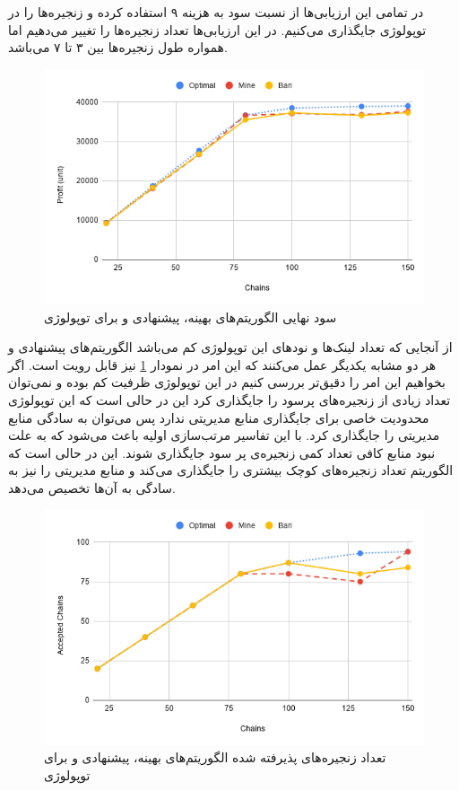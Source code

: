 در تمامی این ارزیابی‌ها از نسبت سود به هزینه ۹ استفاده کرده و
زنجیره‌ها را در توپولوژی  جایگذاری می‌کنیم.
در این ارزیابی‌ها تعداد زنجیره‌ها را تغییر می‌دهیم اما همواره طول زنجیره‌ها بین ۳ تا ۷ می‌باشد.


\begin{figure}[h!]
\center\includegraphics[scale=.5]{images/chart-6}
\caption{سود نهایی الگوریتم‌های بهینه، پیشنهادی و \cite{Bari2015} برای توپولوژی }
\label{fig.11}
\end{figure}

از آنجایی که تعداد لینک‌ها و نودهای این توپولوژی کم می‌باشد الگوریتم‌های پیشنهادی و \cite{Bari2015} هر دو مشابه یکدیگر عمل می‌کنند
که این امر در نمودار \ref{fig.11}
نیز قابل رویت است.
اگر بخواهیم این امر را دقیق‌تر بررسی کنیم در این توپولوژی ظرفیت کم بوده و نمی‌توان تعداد زیادی از زنجیره‌های پرسود
را جایگذاری کرد این در حالی است که این توپولوژی محدودیت خاصی برای جایگذاری منابع مدیریتی ندارد
پس می‌توان به سادگی منابع مدیریتی را جایگذاری کرد.
با این تفاسیر مرتب‌سازی اولیه باعث می‌شود که به علت نبود منابع کافی تعداد کمی زنجیره‌ی پر سود جایگذاری شوند.
این در حالی است که الگوریتم \cite{Bari2015}
تعداد زنجیره‌های کوچک بیشتری را جایگذاری می‌کند و منابع مدیریتی را نیز به سادگی به آن‌ها تخصیص می‌دهد.


\begin{figure}[h!]
\center\includegraphics[scale=.5]{images/chart-7}
\caption{تعداد زنجیره‌های پذیرفته شده الگوریتم‌های بهینه، پیشنهادی و \cite{Bari2015} برای توپولوژی }
\label{fig.12}
\end{figure}

